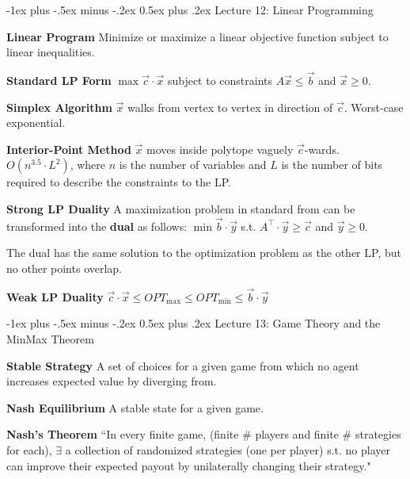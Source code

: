 \documentclass[10pt,landscape]{article}
\makeatletter
\renewcommand{\section}{\@startsection{section}{1}{0mm}%
                                {-1ex plus -.5ex minus -.2ex}%
                                {0.5ex plus .2ex}%
                                {\normalfont\large\bfseries}}
\newcommand{\definition}[1]{\textbf{#1}\hspace{2pt}}
\makeatother
\begin{document}
\begin{multicols}{3}

\section{Lecture 12: Linear Programming}

\definition{Linear Program} Minimize or maximize a linear objective function subject to linear inequalities.

\definition{Standard LP Form} $\max \vec{c} \cdot \vec{x}$ subject to constraints $A \vec{x} \leq \vec{b}$ and $\vec{x} \geq 0$.


\definition{Simplex Algorithm} $\vec{x}$ walks from vertex to vertex in direction of $\vec{c}$. Worst-case exponential.

\definition{Interior-Point Method} $\vec{x}$ moves inside polytope vaguely $\vec{c}$-wards. $O(n^{3.5} \cdot L^2)$, where $n$ is the number of variables and $L$ is the number of bits required to describe the constraints to the LP.

\definition{Strong LP Duality} A maximization problem in standard from can be transformed into the \textbf{dual} as follows: $\min \vec{b} \cdot \vec{y}$ s.t. $A^{\top} \cdot \vec{y} \geq \vec{c}$ and $\vec{y} \geq 0$.

The dual has the same solution to the optimization problem as the other LP, but no other points overlap.

\definition{Weak LP Duality} $\vec{c} \cdot \vec{x} \leq OPT_{\max} \leq OPT_{\min} \leq \vec{b} \cdot \vec{y}$


\section{Lecture 13: Game Theory and the MinMax Theorem}

\definition{Stable Strategy} A set of choices for a given game from which no agent increases expected value by diverging from.

\definition{Nash Equilibrium} A stable state for a given game.

\definition{Nash's Theorem} ``In every finite game, (finite \# players and finite \# strategies for each), $\exists$ a collection of randomized strategies (one per player) s.t. no player can improve their expected payout by unilaterally changing their strategy."


\end{multicols}
\end{document}
